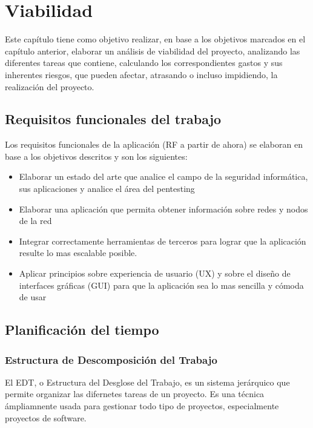 \chapter{Viabilidad}
Este capítulo tiene como objetivo realizar, en base a los objetivos marcados en el capítulo anterior, elaborar un análisis de viabilidad del proyecto, analizando las diferentes tareas que contiene, calculando los correspondientes gastos y sus inherentes riesgos, que pueden afectar, atrasando o incluso impidiendo, la realización del proyecto.

\section{Requisitos funcionales del trabajo}
Los requisitos funcionales de la aplicación (RF a partir de ahora) se elaboran en base a los objetivos descritos y son los siguientes:

\begin{itemize}
	\item Elaborar un estado del arte que analice el campo de la seguridad informática, sus aplicaciones y analice el área del pentesting
	\item Elaborar una aplicación que permita obtener información sobre redes y nodos de la red
	\item Integrar correctamente herramientas de terceros para lograr que la aplicación resulte lo mas escalable posible.
	\item Aplicar principios sobre experiencia de usuario (UX) y sobre el diseño de interfaces gráficas (GUI) para que la aplicación sea lo mas sencilla y cómoda de usar
\end{itemize}


\section{Planificación del tiempo}

\subsection[EDT]{Estructura de Descomposición del Trabajo}
El EDT, o Estructura del Desglose del Trabajo, es un sistema jerárquico que permite organizar las difernetes tareas de un proyecto. Es una técnica ámpliamnente usada para gestionar todo tipo de proyectos, especialmente proyectos de software.

